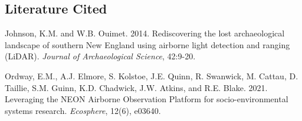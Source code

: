 \documentclass[
]{article}
\begin{document}
\hypertarget{literature-cited}{%
\subsection{Literature Cited}\label{literature-cited}}

Johnson, K.M. and W.B. Ouimet. 2014. Rediscovering the lost
archaeological landscape of southern New England using airborne light
detection and ranging (LiDAR). \emph{Journal of Archaeological Science},
42:9-20.

Ordway, E.M., A.J. Elmore, S. Kolstoe, J.E. Quinn, R. Swanwick, M.
Cattau, D. Taillie, S.M. Guinn, K.D. Chadwick, J.W. Atkins, and R.E.
Blake. 2021. Leveraging the NEON Airborne Observation Platform for
socio-environmental systems research. \emph{Ecosphere}, 12(6), e03640.
\end{document}
